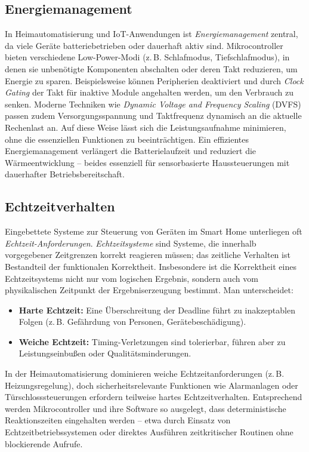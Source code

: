 \subsection*{Energiemanagement}
In Heimautomatisierung und IoT-Anwendungen ist \emph{Energiemanagement} zentral, da viele Geräte batteriebetrieben oder dauerhaft aktiv sind. Mikrocontroller bieten verschiedene Low-Power-Modi (z.\,B. Schlafmodus, Tiefschlafmodus), in denen sie unbenötigte Komponenten abschalten oder deren Takt reduzieren, um Energie zu sparen. \autocite{energiesparen} Beispielsweise können Peripherien deaktiviert und durch \emph{Clock Gating} der Takt für inaktive Module angehalten werden, um den Verbrauch zu senken. \autocite{energiesparen} Moderne Techniken wie \emph{Dynamic Voltage and Frequency Scaling} (DVFS) passen zudem Versorgungsspannung und Taktfrequenz dynamisch an die aktuelle Rechenlast an. \autocite{energiesparen} Auf diese Weise lässt sich die Leistungsaufnahme minimieren, ohne die essenziellen Funktionen zu beeinträchtigen. Ein effizientes Energiemanagement verlängert die Batterielaufzeit und reduziert die Wärmeentwicklung – beides essenziell für sensorbasierte Haussteuerungen mit dauerhafter Betriebsbereitschaft.

\subsection*{Echtzeitverhalten}
Eingebettete Systeme zur Steuerung von Geräten im Smart Home unterliegen oft \emph{Echtzeit-Anforderungen}. \emph{Echtzeitsysteme} sind Systeme, die innerhalb vorgegebener Zeitgrenzen korrekt reagieren müssen; das zeitliche Verhalten ist Bestandteil der funktionalen Korrektheit. \autocite{echtzeit_grundlagen} Insbesondere ist die Korrektheit eines Echtzeitsystems nicht nur vom logischen Ergebnis, sondern auch vom physikalischen Zeitpunkt der Ergebniserzeugung bestimmt. \autocite{echtzeit_grundlagen} Man unterscheidet:
\begin{itemize}
  \item \textbf{Harte Echtzeit:} Eine Überschreitung der Deadline führt zu inakzeptablen Folgen (z.\,B. Gefährdung von Personen, Gerätebeschädigung). \autocite{echtzeit_grundlagen}
  \item \textbf{Weiche Echtzeit:} Timing-Verletzungen sind tolerierbar, führen aber zu Leistungseinbußen oder Qualitätsminderungen. \autocite{echtzeit_grundlagen}
\end{itemize}
In der Heimautomatisierung dominieren weiche Echtzeitanforderungen (z.\,B. Heizungsregelung), doch sicherheitsrelevante Funktionen wie Alarmanlagen oder Türschlosssteuerungen erfordern teilweise hartes Echtzeitverhalten. Entsprechend werden Mikrocontroller und ihre Software so ausgelegt, dass deterministische Reaktionszeiten eingehalten werden – etwa durch Einsatz von Echtzeitbetriebssystemen oder direktes Ausführen zeitkritischer Routinen ohne blockierende Aufrufe.

